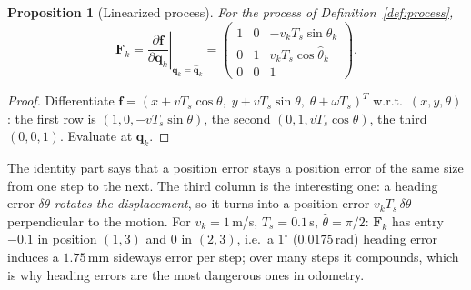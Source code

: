 \documentclass[11pt,a4paper]{article}
\theoremstyle{definition}
\theoremstyle{plain}
\newtheorem{proposition}[definition]{Proposition}
\theoremstyle{remark}
\newcommand{\hq}{\hat{\bm q}}
\begin{document}
\begin{proposition}[Linearized process]
\label{prop:F}
For the process of Definition~\ref{def:process},
\[
\bm F_k=\left.\frac{\partial\bm f}{\partial\bm q_k}\right|_{\bm q_k=\hq_k}=
\begin{pmatrix}
1&0&-v_kT_s\sin\hat\theta_k\\
0&1&v_kT_s\cos\hat\theta_k\\
0&0&1
\end{pmatrix}.
\]
\end{proposition}
\begin{proof}
Differentiate $\bm f=(x+vT_s\cos\theta,\;y+vT_s\sin\theta,\;\theta+\omega T_s)^T$ w.r.t.\ $(x,y,\theta)$: the first row is $(1,0,-vT_s\sin\theta)$, the second $(0,1,vT_s\cos\theta)$, the third $(0,0,1)$. Evaluate at $\hq_k$.
\end{proof}

\begin{intuition}
The identity part says that a position error stays a position error of the same size from one step to the next. The third column is the interesting one: a heading error $\delta\theta$ \emph{rotates the displacement}, so it turns into a position error $v_kT_s\,\delta\theta$ perpendicular to the motion. For $v_k=1$\,m/s, $T_s=0.1$\,s, $\hat\theta=\pi/2$: $\bm F_k$ has entry $-0.1$ in position $(1,3)$ and $0$ in $(2,3)$, i.e.\ a $1^\circ$ ($0.0175$\,rad) heading error induces a $1.75$\,mm sideways error per step; over many steps it compounds, which is why heading errors are the most dangerous ones in odometry.
\end{intuition}
\end{document}
